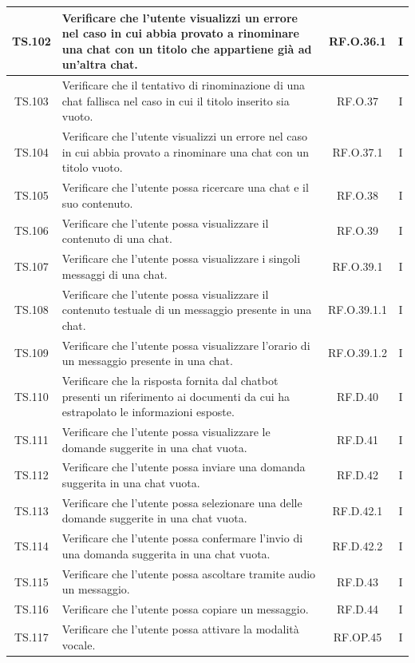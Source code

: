 \documentclass[10pt, a4paper]{article}
\begin{document}
\begin{xltabular}{\textwidth}{|c|X|c|c|}
\hline
TS.102 & Verificare che l'utente visualizzi un errore nel caso in cui abbia provato a rinominare una chat con un titolo che appartiene già ad un’altra chat. & RF.O.36.1 & I \\
\hline
TS.103 & Verificare che il tentativo di rinominazione di una chat fallisca nel caso in cui il titolo inserito sia vuoto. & RF.O.37 & I \\
\hline
TS.104 & Verificare che l'utente visualizzi un errore nel caso in cui abbia provato a rinominare una chat con un titolo vuoto. & RF.O.37.1 & I \\
\hline
TS.105 & Verificare che l'utente possa ricercare una chat e il suo contenuto. & RF.O.38 & I \\
\hline
TS.106 & Verificare che l'utente possa visualizzare il contenuto di una chat. & RF.O.39 & I \\
\hline
TS.107 & Verificare che l'utente possa visualizzare i singoli messaggi di una chat. & RF.O.39.1 & I \\
\hline
TS.108 & Verificare che l'utente possa visualizzare il contenuto testuale di un messaggio presente in una chat. & RF.O.39.1.1 & I \\
\hline
TS.109 & Verificare che l'utente possa visualizzare l’orario di un messaggio presente in una chat. & RF.O.39.1.2 & I \\
\hline
TS.110 & Verificare che la risposta fornita dal chatbot presenti un riferimento ai documenti da cui ha estrapolato le informazioni esposte. & RF.D.40 & I \\
\hline
TS.111 & Verificare che l'utente possa visualizzare le domande suggerite in una chat vuota. & RF.D.41 & I \\
\hline
TS.112 & Verificare che l'utente possa inviare una domanda suggerita in una chat vuota. & RF.D.42 & I \\
\hline
TS.113 & Verificare che l'utente possa selezionare una delle domande suggerite in una chat vuota. & RF.D.42.1 & I \\
\hline
TS.114 & Verificare che l'utente possa confermare l’invio di una domanda suggerita in una chat vuota. & RF.D.42.2 & I \\
\hline
TS.115 & Verificare che l'utente possa ascoltare tramite audio un messaggio. & RF.D.43 & I \\
\hline
TS.116 & Verificare che l'utente possa copiare un messaggio. & RF.D.44 & I \\
\hline
TS.117 & Verificare che l'utente possa attivare la modalità vocale. & RF.OP.45 & I \\

\end{xltabular}
\end{document}
